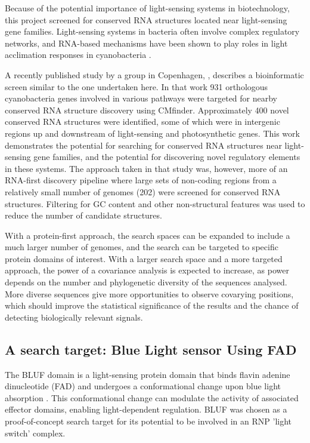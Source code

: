 Because of the potential importance of light-sensing systems in biotechnology, this project screened for conserved RNA structures located near light-sensing gene families.
Light-sensing systems in bacteria often involve complex regulatory networks, and RNA-based mechanisms have been shown to play roles in light acclimation responses in cyanobacteria \citep{Hihara2015}.

A recently published study by a group in Copenhagen, \citet{Geissler2026}, describes a bioinformatic screen similar to the one undertaken here.
In that work 931 orthologous cyanobacteria genes involved in various pathways were targeted for nearby conserved RNA structure discovery using CMfinder.
Approximately 400 novel conserved RNA structures were identified, some of which were in intergenic regions up and downstream of light-sensing and photosynthetic genes.
This work demonstrates the potential for searching for conserved RNA structures near light-sensing gene families, and the potential for discovering novel regulatory elements in these systems.
The approach taken in that study was, however, more of an RNA-first discovery pipeline where large sets of non-coding regions from a relatively small number of genomes (202) were screened for conserved RNA structures.
Filtering for GC content and other non-structural features was used to reduce the number of candidate structures.

With a protein-first approach, the search spaces can be expanded to include a much larger number of genomes, and the search can be targeted to specific protein domains of interest.
With a larger search space and a more targeted approach, the power of a covariance analysis is expected to increase, as power depends on the number and phylogenetic diversity of the sequences analysed.
More diverse sequences give more opportunities to observe covarying positions, which should improve the statistical significance of the results and the chance of detecting biologically relevant signals.

\subsection{A search target: Blue Light sensor Using \ac{FAD}}

The \ac{BLUF} domain is a light-sensing protein domain that binds flavin adenine dinucleotide (FAD) and undergoes a conformational change upon blue light absorption \citep{Kita2005,Gomelsky2002}.
This conformational change can modulate the activity of associated effector domains, enabling light-dependent regulation.
\ac{BLUF} was chosen as a proof-of-concept search target for its potential to be involved in an \ac{RNP} 'light switch' complex.

